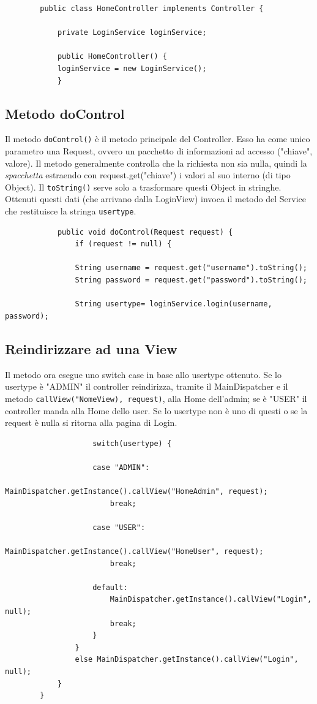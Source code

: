 \documentclass[a4paper,12 pt]{article}
\begin{document}
	\begin{lstlisting}
		public class HomeController implements Controller {
		
			private LoginService loginService;
	
			public HomeController() {
			loginService = new LoginService();
			}
	\end{lstlisting}
	
	\subsection{Metodo doControl}
	Il metodo \texttt{doControl()} è il metodo principale del Controller. Esso ha come unico parametro una Request, ovvero un pacchetto di informazioni ad accesso ("chiave", valore). Il metodo generalmente controlla che la richiesta non sia nulla, quindi la \textit{spacchetta} estraendo con request.get("chiave") i valori al suo interno (di tipo Object). Il \texttt{toString()} serve solo a trasformare questi Object in stringhe. Ottenuti questi dati (che arrivano dalla LoginView) invoca il metodo del Service che restituisce la stringa \texttt{usertype}.
	\begin{lstlisting}
			public void doControl(Request request) {
				if (request != null) {
			
				String username = request.get("username").toString();
				String password = request.get("password").toString();
	
				String usertype= loginService.login(username, password);
		\end{lstlisting}
	\subsection{Reindirizzare ad una View}
	Il metodo ora esegue uno switch case in base allo usertype ottenuto. Se lo usertype è "ADMIN" il controller reindirizza, tramite il MainDispatcher e il metodo \texttt{callView("NomeView), request)}, alla Home dell'admin; se è
	"USER" il controller manda alla Home dello user. Se lo usertype non è uno di questi o se la request è nulla si ritorna alla pagina di Login.
		\begin{lstlisting}	
					switch(usertype) {
				
					case "ADMIN":
						MainDispatcher.getInstance().callView("HomeAdmin", request);
						break;
				
					case "USER": 
						MainDispatcher.getInstance().callView("HomeUser", request);
						break;
				
					default:
						MainDispatcher.getInstance().callView("Login", null);
						break;
					}
				}
				else MainDispatcher.getInstance().callView("Login", null);
			}
		}
	\end{lstlisting}
\end{document}
